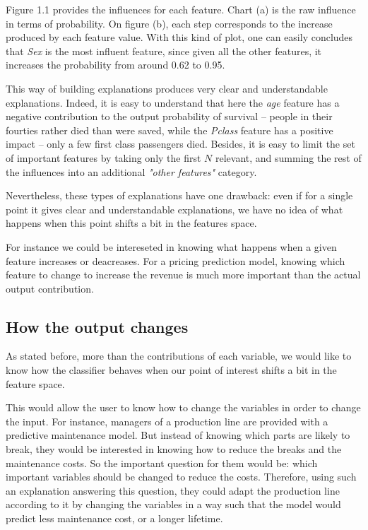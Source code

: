 \documentclass[a4paper,11pt]{kth-mag}
\begin{document}
Figure 1.1 provides the influences for each feature. Chart (a) is the raw influence in terms of probability. On figure (b), each step corresponds to the increase produced by each feature value. With this kind of plot, one can easily concludes that \textit{Sex} is the most influent feature, since given all the other features, it increases the probability from around 0.62 to 0.95.

This way of building explanations produces very clear and understandable explanations. Indeed, it is easy to understand that here the \textit{age} feature has a negative contribution to the output probability of survival -- people in their fourties rather died than were saved, while the \textit{Pclass} feature has a positive impact -- only a few first class passengers died. Besides, it is easy to limit the set of important features by taking only the first $N$ relevant, and summing the rest of the influences into an additional \textit{"other features"} category.

Nevertheless, these types of explanations have one drawback: even if for a single point it gives clear and understandable explanations, we have no idea of what happens when this point shifts a bit in the features space.

For instance we could be intereseted in knowing what happens when a given feature increases or deacreases. For a pricing prediction model, knowing which feature to change to increase the revenue is much more important than the actual output contribution.

\subsection{How the output changes}

As stated before, more than the contributions of each variable, we would like to know how the classifier behaves when our point of interest shifts a bit in the feature space.

This would allow the user to know how to change the variables in order to change the input. For instance, managers of a production line are provided with a predictive maintenance model. But instead of knowing which parts are likely to break, they would be interested in knowing how to reduce the breaks and the maintenance costs. So the important question for them would be: which important variables should be changed to reduce the costs. Therefore, using such an explanation answering this question, they could adapt the production line  according to it by changing the variables in a way such that the model would predict less maintenance cost, or a longer lifetime.
\end{document}
